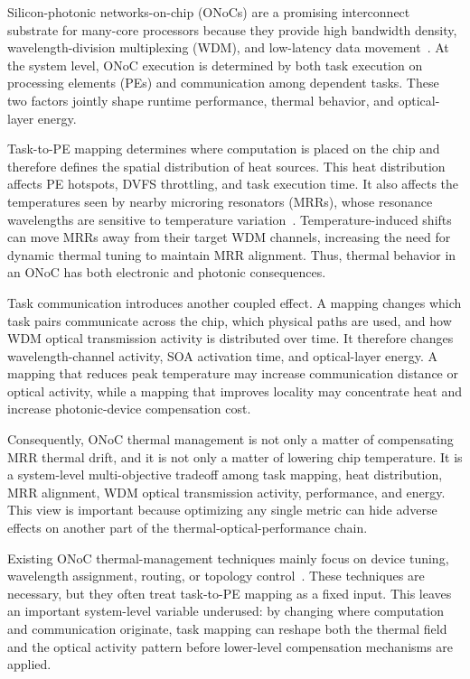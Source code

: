 \documentclass[conference]{IEEEtran}
\begin{document}
Silicon-photonic networks-on-chip (ONoCs) are a promising interconnect substrate for many-core processors because they provide high bandwidth density, wavelength-division multiplexing (WDM), and low-latency data movement~\cite{batten2008,bergman2018}. At the system level, ONoC execution is determined by both task execution on processing elements (PEs) and communication among dependent tasks. These two factors jointly shape runtime performance, thermal behavior, and optical-layer energy.

Task-to-PE mapping determines where computation is placed on the chip and therefore defines the spatial distribution of heat sources. This heat distribution affects PE hotspots, DVFS throttling, and task execution time. It also affects the temperatures seen by nearby microring resonators (MRRs), whose resonance wavelengths are sensitive to temperature variation~\cite{padmaraju2014}. Temperature-induced shifts can move MRRs away from their target WDM channels, increasing the need for dynamic thermal tuning to maintain MRR alignment. Thus, thermal behavior in an ONoC has both electronic and photonic consequences.

Task communication introduces another coupled effect. A mapping changes which task pairs communicate across the chip, which physical paths are used, and how WDM optical transmission activity is distributed over time. It therefore changes wavelength-channel activity, SOA activation time, and optical-layer energy. A mapping that reduces peak temperature may increase communication distance or optical activity, while a mapping that improves locality may concentrate heat and increase photonic-device compensation cost.

Consequently, ONoC thermal management is not only a matter of compensating MRR thermal drift, and it is not only a matter of lowering chip temperature. It is a system-level multi-objective tradeoff among task mapping, heat distribution, MRR alignment, WDM optical transmission activity, performance, and energy. This view is important because optimizing any single metric can hide adverse effects on another part of the thermal-optical-performance chain.

Existing ONoC thermal-management techniques mainly focus on device tuning, wavelength assignment, routing, or topology control~\cite{guha2012,zhou2013,chittamuru2015}. These techniques are necessary, but they often treat task-to-PE mapping as a fixed input. This leaves an important system-level variable underused: by changing where computation and communication originate, task mapping can reshape both the thermal field and the optical activity pattern before lower-level compensation mechanisms are applied.
\end{document}
